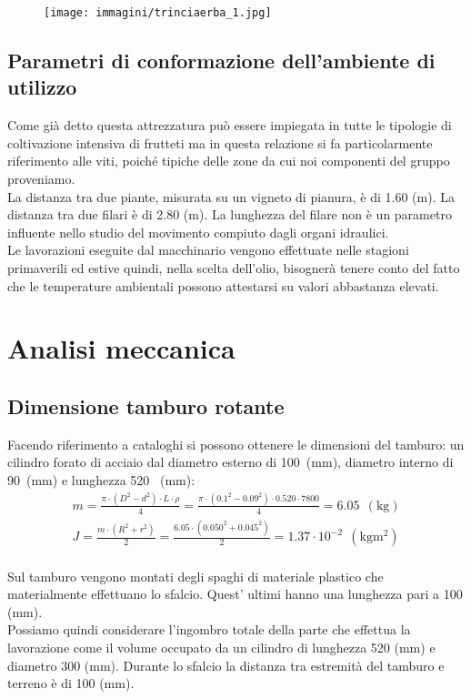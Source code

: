 \documentclass[a4paper,12pt]{article}
\begin{document}
\begin{figure}[H] 
\centering 
\texttt{[image: immagini/trinciaerba\_1.jpg]}

\label{triniaerba_internet}
\end{figure}

\subsection{Parametri di conformazione dell'ambiente di utilizzo}
Come già detto questa attrezzatura può essere impiegata in tutte le tipologie di coltivazione intensiva di frutteti ma in questa relazione si fa particolarmente riferimento alle viti, poiché tipiche delle zone da cui noi componenti del gruppo proveniamo. \\
La distanza tra due piante, misurata su un vigneto di pianura, è di 1.60 (\si{\meter}). La distanza tra due filari è di 2.80 (\si{\meter}). La lunghezza del filare non è un parametro influente nello studio del movimento compiuto dagli organi idraulici.\\
Le lavorazioni eseguite dal macchinario vengono effettuate nelle stagioni primaverili ed estive quindi,  nella scelta dell'olio, bisognerà tenere conto del fatto che le temperature ambientali possono attestarsi su valori abbastanza elevati.

\newpage
\section{Analisi meccanica}
\subsection{Dimensione tamburo rotante}
Facendo riferimento a cataloghi si possono ottenere le dimensioni del tamburo: un cilindro forato di acciaio dal diametro esterno di 100\ (\si{\milli\meter}), diametro interno di 90\ (\si{\milli\meter}) e lunghezza 520 \ (\si{\milli\meter}):
\begin{gather}
    m=\frac{\pi \cdot (D^2-d^2) \cdot L \cdot \rho}{4}=\frac{\pi \cdot (0.1^2-0.09^2) \cdot 0.520 \cdot 7800}{4} = 6.05 \ \ (\si{\kilo\gram})
    \label{Massa_tamburo}\\
    J=\frac{m\cdot (R^2+r^2)}{2}=\frac{6.05\cdot (0.050^2+0.045^2)}{2} = 1.37 \cdot 10^{-2} \ \ (\si{\kilo\gram \square \meter})
    \label{inerzia_tamburo}
\end{gather}\\
Sul tamburo vengono montati degli spaghi di materiale plastico che materialmente effettuano lo sfalcio. Quest' ultimi hanno una lunghezza pari a 100 (\si{\milli\meter}).\\ 
Possiamo quindi considerare l'ingombro totale della parte che effettua la lavorazione come il volume occupato da un cilindro di lunghezza 520 (\si{\milli\meter}) e diametro 300 (\si{\milli\meter}). Durante lo sfalcio la distanza tra estremità del tamburo e terreno è di 100 (\si{\milli\meter}). \\
\end{document}
